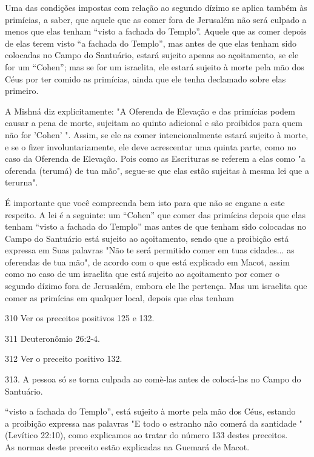 Uma das condições impostas com relação ao segundo dízimo se aplica
também às primícias, a saber, que aquele que as comer fora de Jerusalém
não será culpado a menos que elas tenham ``visto a fachada do Templo''.
Aquele que as comer depois de elas terem visto ``a fachada do Templo'',
mas antes de que elas tenham sido colocadas no Campo do Santuário,
estará sujeito apenas ao açoitamento, se ele for um ``Cohen''; mas se for
um israelita, ele estará sujei­to à morte pela mão dos Céus por ter
comido as primícias, ainda que ele tenha declamado sobre elas primeiro.

A Mishná diz explicitamente: "A Oferenda de Elevação e das primí­cias
podem causar a pena de morte, sujeitam ao quinto adicional e são
proibi­dos para quem não for 'Cohen' ". Assim, se ele as comer
intencionalmente es­tará sujeito à morte, e se o fizer
involuntariamente, ele deve acrescentar uma quinta parte, como no caso
da Oferenda de Elevação. Pois como as Escrituras se referem a elas como
"a oferenda (terumá) de tua mão", segue-se que elas estão sujeitas à
mesma lei que a terurna".

É importante que você compreenda bem isto para que não se enga­ne a este
respeito. A lei é a seguinte: um ``Cohen'' que comer das primícias de­pois
que elas tenham ``visto a fachada do Templo'' mas antes de que tenham sido
colocadas no Campo do Santuário está sujeito ao açoitamento, sendo que a
proibição está expressa em Suas palavras "Não te será permitido comer em
tuas cidades... as oferendas de tua mão", de acordo com o que está
explicado em Macot, assim como no caso de um israelita que está sujeito
ao açoitamento por comer o segundo dízimo fora de Jerusalém, embora ele
lhe pertença. Mas um israelita que comer as primícias em qualquer local,
depois que elas tenham

310 Ver os preceitos positivos 125 e 132.

311 Deuteronômio 26:2-4.

312 Ver o preceito positivo 132.

313. A pessoa só se torna culpada ao comè-las antes de colocá-las no
Campo do Santuário.


``visto a fachada do Templo'', está sujeito à morte pela mão dos Céus,
estando\\
a proibição expressa nas palavras "E todo o estranho não comerá da
santidade
" (Levítico 22:10), como explicamos ao tratar do número 133 destes
preceitos.\\
As normas deste preceito estão explicadas na Guemará de Macot.

